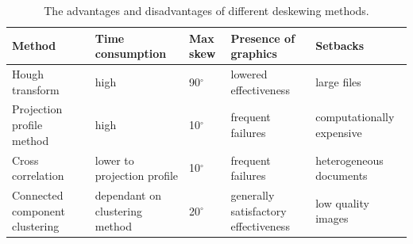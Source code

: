 
\begin{table}[t]
{\footnotesize
\begin{tabular}{p{8em}p{7em}p{2.5em}p{6em}p{9em}}
\toprule
\textbf{Method} & \textbf{Time consumption} & \textbf{Max skew} & \textbf{Presence of graphics} & \textbf{Setbacks} \\
\midrule
Hough transform~\cite{houghTransform}
&
high
&
90$^{\circ}$
&
lowered effectiveness
&
large files
\\
Projection profile method~\cite{skewAngleDetection}
&
high
&
10$^{\circ}$
&
frequent failures
&
computationally expensive
\\
Cross correlation~\cite{skewAngleDetection}
&
lower to projection profile
&
10$^{\circ}$
&
frequent failures
&
heterogeneous documents
\\
Connected component clustering~\citep{skewClustering}
&
dependant on clustering method
&
20$^{\circ}$
&
generally satisfactory effectiveness
&
low quality images
\\
\bottomrule
\end{tabular}
}
\caption{The advantages and disadvantages of different deskewing methods.}
\label{tab:preprocessSkewProsCons}
\end{table}

